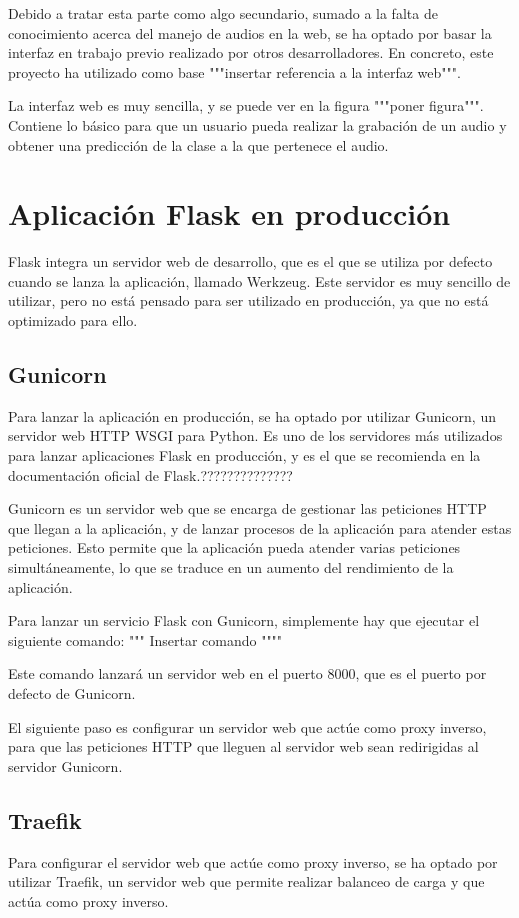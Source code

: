 Debido a tratar esta parte como algo secundario, sumado a la falta de conocimiento acerca del manejo de audios en la web, se ha optado por basar la interfaz en trabajo previo realizado por otros desarrolladores.
En concreto, este proyecto ha utilizado como base """insertar referencia a la interfaz web""".

La interfaz web es muy sencilla, y se puede ver en la figura """poner figura""". 
Contiene lo básico para que un usuario pueda realizar la grabación de un audio y obtener una predicción de la clase a la que pertenece el audio.



\section{Aplicación Flask en producción}
Flask integra un servidor web de desarrollo, que es el que se utiliza por defecto cuando se lanza la aplicación, llamado Werkzeug.
Este servidor es muy sencillo de utilizar, pero no está pensado para ser utilizado en producción, ya que no está optimizado para ello.


\subsection{Gunicorn}
Para lanzar la aplicación en producción, se ha optado por utilizar Gunicorn, un servidor web HTTP WSGI para Python.
Es uno de los servidores más utilizados para lanzar aplicaciones Flask en producción, y es el que se recomienda en la documentación oficial de Flask.??????????????

Gunicorn es un servidor web que se encarga de gestionar las peticiones HTTP que llegan a la aplicación, y de lanzar procesos de la aplicación para atender estas peticiones.
Esto permite que la aplicación pueda atender varias peticiones simultáneamente, lo que se traduce en un aumento del rendimiento de la aplicación.

Para lanzar un servicio Flask con Gunicorn, simplemente hay que ejecutar el siguiente comando:
""" Insertar comando """"

Este comando lanzará un servidor web en el puerto 8000, que es el puerto por defecto de Gunicorn.

El siguiente paso es configurar un servidor web que actúe como proxy inverso, para que las peticiones HTTP que lleguen al servidor web sean redirigidas al servidor Gunicorn.


\subsection{Traefik}
Para configurar el servidor web que actúe como proxy inverso, se ha optado por utilizar Traefik, un servidor web que permite realizar balanceo de carga y que actúa como proxy inverso.


